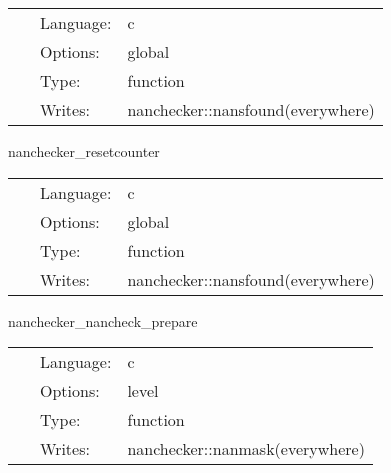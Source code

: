 \documentclass{article}
\begin{document}
\hspace{5mm}

 \begin{tabular*}{160mm}{cll} 
~ & Language:  & c \\ 
~ & Options:  & global \\ 
~ & Type:  & function \\ 
~ & Writes:  & nanchecker::nansfound(everywhere) \\ 
\end{tabular*} 


\vspace{5mm}


\hspace{5mm} nanchecker\_resetcounter 

\hspace{5mm}{\it reset the nanchecker::nansfound counter } 


\hspace{5mm}

 \begin{tabular*}{160mm}{cll} 
~ & Language:  & c \\ 
~ & Options:  & global \\ 
~ & Type:  & function \\ 
~ & Writes:  & nanchecker::nansfound(everywhere) \\ 
\end{tabular*} 


\vspace{5mm}


\hspace{5mm} nanchecker\_nancheck\_prepare 

\hspace{5mm}{\it prepare data structures to check for nans } 


\hspace{5mm}

 \begin{tabular*}{160mm}{cll} 
~ & Language:  & c \\ 
~ & Options:  & level \\ 
~ & Type:  & function \\ 
~ & Writes:  & nanchecker::nanmask(everywhere) \\ 
\end{tabular*} 


\vspace{5mm}
\end{document}
